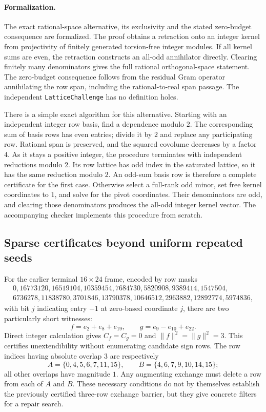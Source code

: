 \paragraph{Formalization.}
The exact rational-space alternative, its exclusivity and the stated
zero-budget consequence are formalized. The proof obtains a retraction
onto an integer kernel from projectivity of finitely generated
torsion-free integer modules. If all kernel sums are even, the retraction
constructs an all-odd annihilator directly. Clearing finitely many
denominators gives the full rational orthogonal-space statement.
The zero-budget consequence follows from the residual Gram operator
annihilating the row span, including the rational-to-real span passage.
The independent \texttt{LatticeChallenge} has no definition holes.

There is a simple exact algorithm for this alternative. Starting with
an independent integer row basis, find a dependence modulo $2$.
The corresponding sum of basis rows has even entries; divide it by
$2$ and replace any participating row. Rational span is preserved,
and the squared covolume decreases by a factor $4$. As it stays a
positive integer, the procedure terminates with independent reductions
modulo $2$. Its row lattice has odd index in the saturated lattice,
so it has the same reduction modulo $2$. An odd-sum basis row is
therefore a complete certificate for the first case. Otherwise select
a full-rank odd minor, set free kernel coordinates to $1$, and solve
for the pivot coordinates. Their denominators are odd, and clearing
those denominators produces the all-odd integer kernel vector.
The accompanying checker implements this procedure from scratch.

\subsection{Sparse certificates beyond uniform repeated seeds}
For the earlier terminal $16\times24$ frame, encoded by row masks
\[
\begin{gathered}
0,16773120,16519104,10359454,7684730,5820908,9389414,1547504,\\
6736278,11838780,3701846,13790378,10646512,2963882,12892774,5974836,
\end{gathered}
\]
with bit $j$ indicating entry $-1$ at zero-based coordinate $j$,
there are two particularly short witnesses:
\[
 f=e_2+e_8+e_{19},\qquad g=e_9-e_{10}+e_{22}.
\]
Direct integer calculation gives $C_f=C_g=0$ and
$\|f\|^2=\|g\|^2=3$. This certifies unextendibility without
enumerating candidate sign rows. The row indices having absolute
overlap $3$ are respectively
\[
 A=\{0,4,5,6,7,11,15\},\qquad
 B=\{4,6,7,9,10,14,15\};
\]
all other overlaps have magnitude $1$. Any augmenting exchange must
delete a row from each of $A$ and $B$. These necessary conditions
do not by themselves establish the previously certified three-row
exchange barrier, but they give concrete filters for a repair search.

